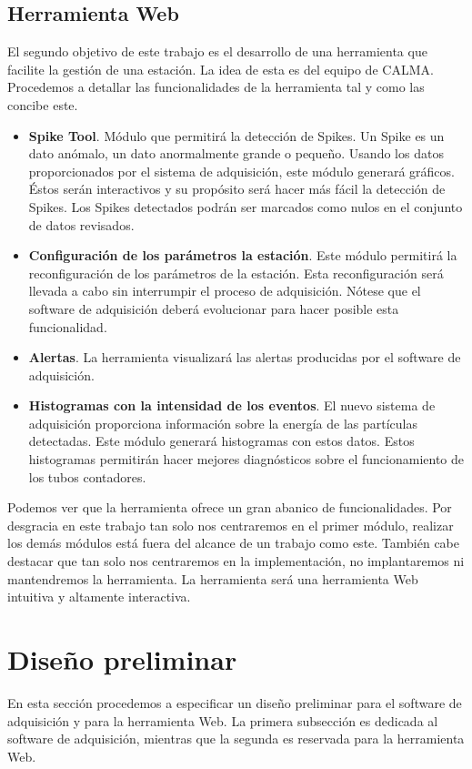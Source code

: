 	\subsection{Herramienta Web}
		El segundo objetivo de este trabajo es el desarrollo de una herramienta que facilite la gestión de una estación. La idea de esta
		es del equipo de CALMA. Procedemos a detallar las funcionalidades de la herramienta tal y como las concibe este.
		\begin{itemize}
			\item	\textbf{Spike Tool}. Módulo que permitirá la detección de Spikes. Un Spike es un dato anómalo, un dato
				anormalmente grande o pequeño. Usando los datos proporcionados por el sistema de adquisición, este módulo generará
				gráficos. Éstos serán interactivos y su propósito será hacer más fácil la detección de Spikes. Los Spikes detectados
				podrán ser marcados como nulos en el conjunto de datos revisados. 
			\item 	\textbf{Configuración de los parámetros la estación}. Este módulo permitirá la reconfiguración de los parámetros de la
				estación. Esta reconfiguración será llevada a cabo sin interrumpir el proceso de adquisición. Nótese que el software
				de adquisición deberá evolucionar para hacer posible esta funcionalidad.
			\item	\textbf{Alertas}. La herramienta visualizará las alertas producidas por el software de adquisición.
			\item 	\textbf{Histogramas con la intensidad de los eventos}. El nuevo sistema de adquisición proporciona información sobre
				la energía de las partículas detectadas. Este módulo generará histogramas con estos datos. Estos histogramas
				permitirán hacer mejores diagnósticos sobre el funcionamiento de los tubos contadores. 
		\end{itemize}
		Podemos ver que la herramienta ofrece un gran abanico de funcionalidades. Por desgracia en este trabajo tan solo nos centraremos en el
		primer módulo, realizar los demás módulos está fuera del alcance de un trabajo como este. También cabe destacar que tan solo nos
		centraremos en la implementación, no implantaremos ni mantendremos la herramienta. La herramienta será una herramienta Web intuitiva y
		altamente interactiva.

\section{Diseño preliminar}
	En esta sección procedemos a especificar un diseño preliminar para el software de adquisición y para la herramienta Web. La primera subsección
	es dedicada al software de adquisición, mientras que la segunda es reservada para la herramienta Web.
